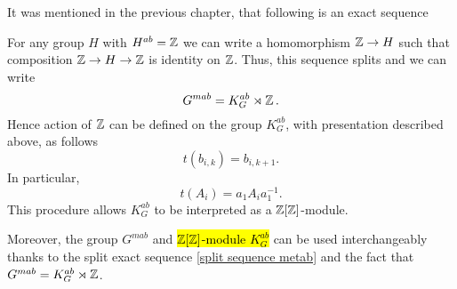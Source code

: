 It was mentioned in the previous chapter, that following is an exact sequence
\begin{center}
\end{center}
For any group $H$ with $H^{ab}=\operatorname{\mathbb{Z}}$ we can write a homomorphism $\operatorname{\mathbb{Z}}\to H$ such that composition $\operatorname{\mathbb{Z}}\to H\to \operatorname{\mathbb{Z}}$ is identity on $\operatorname{\mathbb{Z}}$. Thus, this sequence splits and we can write 
$$G^{mab}=K^{ab}_G\rtimes \operatorname{\mathbb{Z}}.$$ 
Hence action of $\operatorname{\mathbb{Z}}$ can be defined on the group $K^{ab}_G$, with presentation described above, as follows 
$$t(b_{i, k})=b_{i, k+1}.$$
In particular, 
$$t(A_i)=a_1 A_i a_1^{-1}.$$
This procedure allows $K_G^{ab}$ to be interpreted as a $\operatorname{\mathbb{Z}}[\operatorname{\mathbb{Z}}]$-module.

Moreover, the group $G^{mab}$ and \hl{$\operatorname{\mathbb{Z}}[\operatorname{\mathbb{Z}}]$-module $K_G^{ab}$} can be used interchangeably thanks to the split exact sequence \eqref{split sequence metab} and the fact that $G^{mab}=K_G^{ab}\rtimes \operatorname{\mathbb{Z}}$.

%






